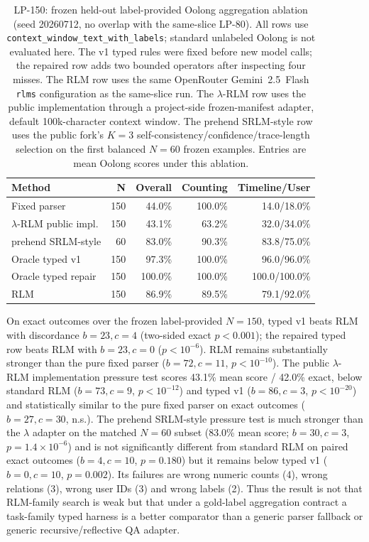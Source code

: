 \begin{table}[!t]
\centering
\small
\setlength{\tabcolsep}{4pt}
\begin{tabular}{@{}lrrrr@{}}
\toprule
\textbf{Method} & \textbf{N} & \textbf{Overall} & \textbf{Counting} & \textbf{Timeline/User} \\
\midrule
Fixed parser & 150 & 44.0\% & 100.0\% & 14.0/18.0\% \\
$\lambda$-RLM public impl. & 150 & 43.1\% & 63.2\% & 32.0/34.0\% \\
prehend SRLM-style & 60 & 83.0\% & 90.3\% & 83.8/75.0\% \\
Oracle typed v1 & 150 & 97.3\% & 100.0\% & 96.0/96.0\% \\
Oracle typed repair & 150 & 100.0\% & 100.0\% & 100.0/100.0\% \\
RLM & 150 & 86.9\% & 89.5\% & 79.1/92.0\% \\
\bottomrule
\end{tabular}
\caption{LP-150: frozen held-out label-provided Oolong aggregation ablation (seed 20260712, no overlap with the same-slice LP-80). All rows use \texttt{context\_window\_text\_with\_labels}; standard unlabeled Oolong is not evaluated here. The v1 typed rules were fixed before new model calls; the repaired row adds two bounded operators after inspecting four misses. The RLM row uses the same OpenRouter Gemini~2.5~Flash \texttt{rlms} configuration as the same-slice run. The $\lambda$-RLM row uses the public implementation through a project-side frozen-manifest adapter, default 100k-character context window. The prehend SRLM-style row uses the public fork's $K=3$ self-consistency/confidence/trace-length selection on the first balanced $N=60$ frozen examples. Entries are mean Oolong scores under this ablation.}
\label{tab:supp-oolong-heldout}
\end{table}

On exact outcomes over the frozen label-provided $N=150$, typed v1 beats RLM with discordance $b=23,c=4$ (two-sided exact $p<0.001$); the repaired typed row beats RLM with $b=23,c=0$ ($p<10^{-6}$). RLM remains substantially stronger than the pure fixed parser ($b=72,c=11$, $p<10^{-10}$). The public $\lambda$-RLM implementation pressure test scores 43.1\% mean score / 42.0\% exact, below standard RLM ($b=73,c=9$, $p<10^{-12}$) and typed v1 ($b=86,c=3$, $p<10^{-20}$) and statistically similar to the pure fixed parser on exact outcomes ($b=27,c=30$, n.s.). The prehend SRLM-style pressure test is much stronger than the $\lambda$ adapter on the matched $N=60$ subset (83.0\% mean score; $b=30,c=3$, $p=1.4{\times}10^{-6}$) and is not significantly different from standard RLM on paired exact outcomes ($b=4,c=10$, $p=0.180$) but it remains below typed v1 ($b=0,c=10$, $p=0.002$). Its failures are wrong numeric counts (4), wrong relations (3), wrong user IDs (3) and wrong labels (2). Thus the result is not that RLM-family search is weak but that under a gold-label aggregation contract a task-family typed harness is a better comparator than a generic parser fallback or generic recursive/reflective QA adapter.

